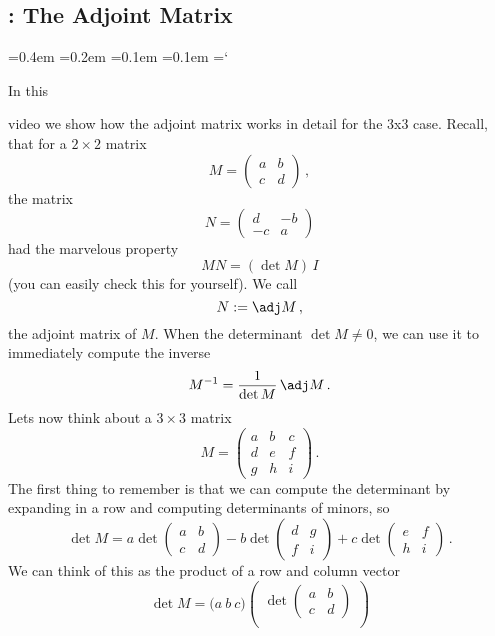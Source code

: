 
\subsection{ \propDetTitle: The Adjoint Matrix}

{\ttfamily
{}\font=0.4em
\font=0.2em
\font=0.1em
\font=0.1em
\hyphenchar\font=`\-





\hypertarget{video_properties_of_determinant_adjoint}{In this} video we show how the adjoint 
matrix works in detail for the 3x3 case. Recall, that for a $2\times 2$ matrix
\[
M=\begin{pmatrix}a&b\\c&d\end{pmatrix}\, ,
\]
the matrix
\[
N=\begin{pmatrix}d&-b\\ -c & a\end{pmatrix}
\]
had the marvelous property
\[
MN=(\det M)\, I
\]
(you can easily check this for yourself). We call \[N:=\adj M\, ,\] the 
adjoint matrix of $M$. When the determinant $\det M\neq 0$, we can use it to immediately compute the inverse
\[
M^{-1}=\frac{1}{\det M}\, \adj M\, .
\]
Lets now think about a $3\times 3$ matrix 
\[
M=\begin{pmatrix}
a &b&c\\d&e&f\\g&h&i\end{pmatrix}\, .
\]
The first thing to remember is that we can compute the determinant by expanding in a row and computing determinants of minors, so
\[
\det M = a \det\begin{pmatrix}a&b\\c&d\end{pmatrix}
-b\det\begin{pmatrix}d&g\\f&i\end{pmatrix}
+c\det\begin{pmatrix}e&f\\h&i\end{pmatrix}\, .
\]
We can think of this as the product of a row and column vector
\[
\det M = \Big( a \ b \ c \Big)
\begin{pmatrix} \det\begin{pmatrix}a&b\\c&d\end{pmatrix}\\[2mm]

\end{pmatrix}\]}
